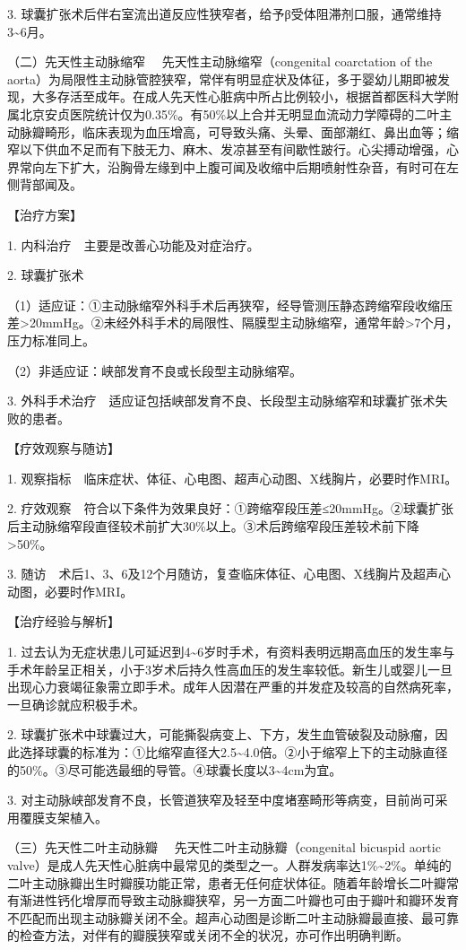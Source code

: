 3.
球囊扩张术后伴右室流出道反应性狭窄者，给予β受体阻滞剂口服，通常维持3\textasciitilde{}6月。

{（二）先天性主动脉缩窄} 　先天性主动脉缩窄（congenital coarctation of
the
aorta）为局限性主动脉管腔狭窄，常伴有明显症状及体征，多于婴幼儿期即被发现，大多存活至成年。在成人先天性心脏病中所占比例较小，根据首都医科大学附属北京安贞医院统计仅为0.35\%。有50\%以上合并无明显血流动力学障碍的二叶主动脉瓣畸形，临床表现为血压增高，可导致头痛、头晕、面部潮红、鼻出血等；缩窄以下供血不足而有下肢无力、麻木、发凉甚至有间歇性跛行。心尖搏动增强，心界常向左下扩大，沿胸骨左缘到中上腹可闻及收缩中后期喷射性杂音，有时可在左侧背部闻及。

【治疗方案】

1. 内科治疗　主要是改善心功能及对症治疗。

2. 球囊扩张术

（1）适应证：①主动脉缩窄外科手术后再狭窄，经导管测压静态跨缩窄段收缩压差\textgreater{}20mmHg。②未经外科手术的局限性、隔膜型主动脉缩窄，通常年龄\textgreater{}7个月，压力标准同上。

（2）非适应证：峡部发育不良或长段型主动脉缩窄。

3.
外科手术治疗　适应证包括峡部发育不良、长段型主动脉缩窄和球囊扩张术失败的患者。

【疗效观察与随访】

1. 观察指标　临床症状、体征、心电图、超声心动图、X线胸片，必要时作MRI。

2.
疗效观察　符合以下条件为效果良好：①跨缩窄段压差≤20mmHg。②球囊扩张后主动脉缩窄段直径较术前扩大30\%以上。③术后跨缩窄段压差较术前下降\textgreater{}50\%。

3.
随访　术后1、3、6及12个月随访，复查临床体征、心电图、X线胸片及超声心动图，必要时作MRI。

【治疗经验与解析】

1.
过去认为无症状患儿可延迟到4\textasciitilde{}6岁时手术，有资料表明远期高血压的发生率与手术年龄呈正相关，小于3岁术后持久性高血压的发生率较低。新生儿或婴儿一旦出现心力衰竭征象需立即手术。成年人因潜在严重的并发症及较高的自然病死率，一旦确诊就应积极手术。

2.
球囊扩张术中球囊过大，可能撕裂病变上、下方，发生血管破裂及动脉瘤，因此选择球囊的标准为：①比缩窄直径大2.5\textasciitilde{}4.0倍。②小于缩窄上下的主动脉直径的50\%。③尽可能选最细的导管。④球囊长度以3\textasciitilde{}4cm为宜。

3.
对主动脉峡部发育不良，长管道狭窄及轻至中度堵塞畸形等病变，目前尚可采用覆膜支架植入。

{（三）先天性二叶主动脉瓣} 　先天性二叶主动脉瓣（congenital bicuspid
aortic
valve）是成人先天性心脏病中最常见的类型之一。人群发病率达1\%\textasciitilde{}2\%。单纯的二叶主动脉瓣出生时瓣膜功能正常，患者无任何症状体征。随着年龄增长二叶瓣常有渐进性钙化增厚而导致主动脉瓣狭窄，另一方面二叶瓣也可由于瓣叶和瓣环发育不匹配而出现主动脉瓣关闭不全。超声心动图是诊断二叶主动脉瓣最直接、最可靠的检查方法，对伴有的瓣膜狭窄或关闭不全的状况，亦可作出明确判断。

